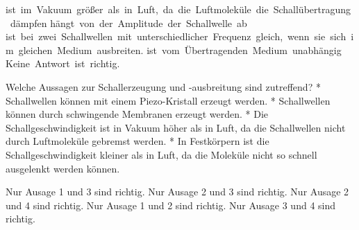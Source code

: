 \documentclass[11pt]{exam}
\begin{document}
\begin{questions}
\begin{choices}
	\choice ist im Vakuum größer als in Luft, da die Luftmoleküle die Schallübertragung dämpfen
	\choice hängt von der Amplitude der Schallwelle ab
	\choice ist bei zwei Schallwellen mit unterschiedlicher Frequenz gleich, wenn sie sich im gleichen Medium ausbreiten.
	\choice ist vom Übertragenden Medium unabhängig
	\choice Keine Antwort ist richtig.
\end{choices}

\vspace{3mm}\question Welche Aussagen zur Schallerzeugung und -ausbreitung sind zutreffend?	* Schallwellen können mit einem Piezo-Kristall erzeugt werden.	* Schallwellen können durch schwingende Membranen erzeugt werden.	* Die Schallgeschwindigkeit ist in Vakuum höher als in Luft, da die Schallwellen nicht durch Luftmoleküle gebremst werden.	* In Festkörpern ist die Schallgeschwindigkeit kleiner als in Luft, da die Moleküle nicht so schnell ausgelenkt werden können. 

\begin{choices}
	\choice Nur Ausage 1 und 3 sind richtig.
	\choice Nur Ausage 2 und 3 sind richtig.
	\choice Nur Ausage 2 und 4 sind richtig.
	\choice Nur Ausage 1 und 2 sind richtig.
	\choice Nur Ausage 3 und 4 sind richtig.
\end{choices}

\vspace{3mm}\end{questions}
\end{document}
